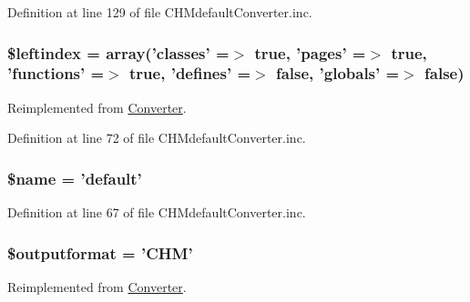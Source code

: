 \-Definition at line 129 of file \-C\-H\-Mdefault\-Converter.\-inc.

\hypertarget{class_c_h_mdefault_converter_ab49669c749559bb7833762878adb8f0c}{
\subsubsection[{\$leftindex}]{\setlength{\rightskip}{0pt plus 5cm}\$leftindex = array('classes' =$>$ true, 'pages' =$>$ true, 'functions' =$>$ true, 'defines' =$>$ false, 'globals' =$>$ false)}}\label{class_c_h_mdefault_converter_ab49669c749559bb7833762878adb8f0c}


\-Reimplemented from \hyperlink{class_converter_ab49669c749559bb7833762878adb8f0c}{\-Converter}.



\-Definition at line 72 of file \-C\-H\-Mdefault\-Converter.\-inc.

\hypertarget{class_c_h_mdefault_converter_ab2fc40d43824ea3e1ce5d86dee0d763b}{
\subsubsection[{\$name}]{\setlength{\rightskip}{0pt plus 5cm}\$name = 'default'}}\label{class_c_h_mdefault_converter_ab2fc40d43824ea3e1ce5d86dee0d763b}


\-Definition at line 67 of file \-C\-H\-Mdefault\-Converter.\-inc.

\hypertarget{class_c_h_mdefault_converter_af0bfe153c049d957e8ea29b147025108}{
\subsubsection[{\$outputformat}]{\setlength{\rightskip}{0pt plus 5cm}\$outputformat = '\-C\-H\-M'}}\label{class_c_h_mdefault_converter_af0bfe153c049d957e8ea29b147025108}


\-Reimplemented from \hyperlink{class_converter_af0bfe153c049d957e8ea29b147025108}{\-Converter}.



